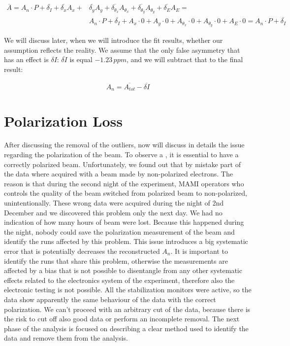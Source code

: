 \begin{align} \label{eq:CancelOut}
\overline{A} = A_{n} \cdot P + \overline{\delta_{I}} + \overline{\delta_{x}}A_{x} + & \overline{\delta_{y}} A_{y} + \overline{\delta_{\theta_{x}}} A_{\theta_{x}} + \overline{\delta_{\theta_{y}}} A_{\theta_{y}} + \overline{\delta_{E}}A_{E} = \\
& A_{n} \cdot P + \overline{\delta_{I}} + A_{x}\cdot 0 + A_{y} \cdot 0 +  A_{\theta_{x}} \cdot 0 +  A_{\theta_{y}} \cdot 0 + A_{E} \cdot 0 = A_{n} \cdot P + \overline{\delta_{I}}
\end{align}  

We will discuss later, when we will introduce the fit results, whether our assumption reflects the reality. We assume that the only false asymmetry that has an effect is $\delta I$: $\overline{\delta I}$ is equal $-1.23 \, ppm$, and we will subtract that to the final result:

\begin{align*}
A_{n} = \overline{A_{tot}} - \overline{\delta I}
\end{align*}

\section{Polarization Loss}

After discussing the removal of the outliers, now will discuss in details the issue regarding the polarization of the beam. To observe a \transv, it is essential to have a correctly polarized beam.
Unfortunately, we found out that by mistake part of the data where acquired with a beam made by non-polarized electrons. The reason is that during the second night of the experiment, MAMI operators who controls the quality of the beam switched from polarized beam to non-polarized, unintentionally. These wrong data were acquired during the night of 2nd December and we discovered this problem only the next day. We had no indication of how many hours of beam were lost. Because this happened during the night, nobody could save the polarization measurement of the beam and identify the runs affected by this problem.
This issue introduces a big systematic error that is potentially decreases the reconstructed $A_{n}$. It is important to identify the runs that share this problem, otherwise the measurements are affected by a bias that is not possible to disentangle from any other systematic effects related to the electronics system of the experiment, therefore also the electronic testing is not possible. 
All the stabilization monitors were active, so the data show apparently the same behaviour of the data with the correct polarization. We can't proceed with an arbitrary cut of the data, because there is the risk to cut off also good data or perform an incomplete removal. The next phase of the analysis is focused on describing a clear method used to identify the data and remove them from the analysis.
 

